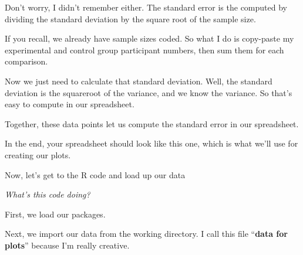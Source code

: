 \documentclass[
]{book}
\newenvironment{Shaded}{\begin{snugshade}}{\end{snugshade}}
\newcommand{\CommentTok}[1]{\textcolor[rgb]{0.56,0.35,0.01}{\textit{#1}}}
\newcommand{\FunctionTok}[1]{\textcolor[rgb]{0.13,0.29,0.53}{\textbf{#1}}}
\newcommand{\NormalTok}[1]{#1}
\newcommand{\OtherTok}[1]{\textcolor[rgb]{0.56,0.35,0.01}{#1}}
\newcommand{\SpecialCharTok}[1]{\textcolor[rgb]{0.81,0.36,0.00}{\textbf{#1}}}
\newcommand{\StringTok}[1]{\textcolor[rgb]{0.31,0.60,0.02}{#1}}
\begin{document}
Don't worry, I didn't remember either. The standard error is the computed by dividing the standard deviation by the square root of the sample size.

If you recall, we already have sample sizes coded. So what I do is copy-paste my experimental and control group participant numbers, then sum them for each comparison.

Now we just need to calculate that standard deviation. Well, the standard deviation is the squareroot of the variance, and we know the variance. So that's easy to compute in our spreadsheet.

Together, these data points let us compute the standard error in our spreadsheet.

In the end, your spreadsheet should look like this one, which is what we'll use for creating our plots.

Now, let's get to the R code and load up our data

\begin{Shaded}
\end{Shaded}

\emph{What's this code doing?}

First, we load our packages.

Next, we import our data from the working directory. I call this file ``\textbf{data for plots}'' because I'm really creative.
\end{document}
